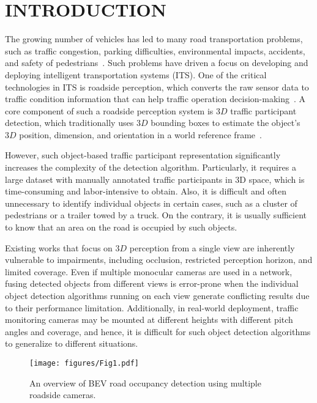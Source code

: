 \section{INTRODUCTION}

The growing number of vehicles has led to many road transportation problems, such as traffic congestion, parking difficulties, environmental impacts, accidents, and safety of pedestrians~\cite{rodrigue2020geography}. Such problems have driven a focus on developing and deploying intelligent transportation systems (ITS). One of the critical technologies in ITS is roadside perception, which converts the raw sensor data to traffic condition information that can help traffic operation decision-making~\cite {xiong2012intelligent}. A core component of such a roadside perception system is $3D$ traffic participant detection, which traditionally uses $3D$ bounding boxes to estimate the object’s $3D$ position, dimension, and orientation in a world reference frame~\cite{arnold2020cooperative}.

However, such object-based traffic participant representation significantly increases the complexity of the detection algorithm. Particularly, it requires a large dataset with manually annotated traffic participants in 3D space, which is time-consuming and labor-intensive to obtain. Also, it is difficult and often unnecessary to identify individual objects in certain cases, such as a cluster of pedestrians or a trailer towed by a truck. On the contrary, it is usually sufficient to know that an area on the road is occupied by such objects. 

Existing works \cite{ye2022rope3d}\cite{yang2023bevheight}\cite{Agrawal2024SemiAutomaticAO} that focus on $3D$ perception from a single view are inherently vulnerable to impairments, including occlusion, restricted perception horizon, and limited coverage. Even if multiple monocular cameras are used in a network, fusing detected objects from different views is error-prone when the individual object detection algorithms running on each view generate conflicting results due to their performance limitation. Additionally, in real-world deployment, traffic monitoring cameras may be mounted at different heights with different pitch angles and coverage, and hence, it is difficult for such object detection algorithms to generalize to different situations.

\begin{figure}[t]
    \centering
    \texttt{[image: figures/Fig1.pdf]}
    \caption{An overview of BEV road occupancy detection using multiple roadside cameras.}
    \label{fig:fig1}
\vspace{-0.25in}
\end{figure}

